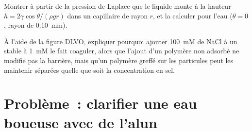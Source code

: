 \begin{exercise}[$\star\star\star$]\label{exo:b3:colloids:11}
Montrer à partir de la pression de Laplace que le liquide monte à la
hauteur $h = 2\gamma\cos\theta/(\rho gr)$ dans un
capillaire de rayon $r$, et la calculer pour l'eau ($\theta = 0$, rayon
de \qty{0.10}{mm}).
\end{exercise}

\begin{exercise}[$\star\star\star$]\label{exo:b3:colloids:12}
À l'aide de la figure DLVO, expliquer pourquoi ajouter \qty{100}{mM} de
NaCl à un  stable à \qty{1}{mM} le fait coaguler, alors que l'ajout
d'un polymère non adsorbé ne modifie pas la barrière, mais qu'un polymère
greffé sur les particules peut les maintenir séparées quelle que soit la
concentration en sel.
\end{exercise}

\clearpage
\enlargethispage{3\baselineskip}
\section{Problème~: clarifier une eau boueuse avec de l'alun}


